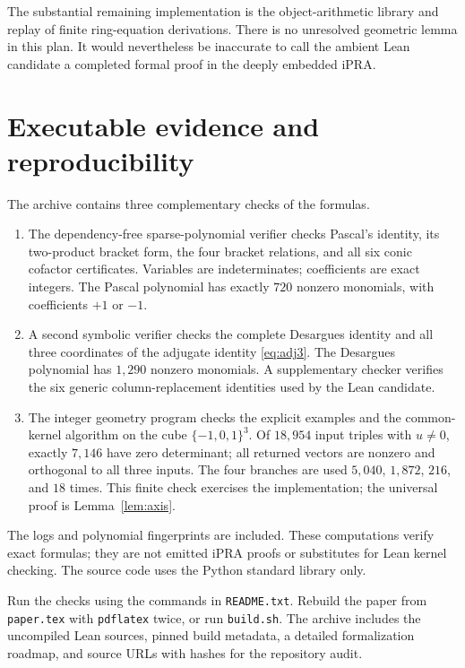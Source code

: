The substantial remaining implementation is the object-arithmetic
library and replay of finite ring-equation derivations. There is no
unresolved geometric lemma in this plan. It would nevertheless be
inaccurate to call the ambient Lean candidate a completed formal proof
in the deeply embedded iPRA.

\section{Executable evidence and reproducibility}\label{sec:evidence}

The archive contains three complementary checks of the formulas.
\begin{enumerate}
\item The dependency-free sparse-polynomial verifier checks Pascal's
identity, its two-product bracket form, the four bracket relations, and
all six conic cofactor certificates. Variables are indeterminates;
coefficients are exact integers. The Pascal polynomial has exactly
$720$ nonzero monomials, with coefficients $+1$ or $-1$.

\item A second symbolic verifier checks the complete Desargues identity
and all three coordinates of the adjugate identity
\eqref{eq:adj3}. The Desargues polynomial has $1{,}290$ nonzero monomials.
A supplementary checker verifies the six generic column-replacement
identities used by the Lean candidate.

\item The integer geometry program checks the explicit examples and
the common-kernel algorithm on the cube $\{-1,0,1\}^3$.
Of $18{,}954$ input triples with $u\ne0$, exactly $7{,}146$ have zero
determinant; all returned vectors are nonzero and orthogonal to all
three inputs. The four branches are used $5{,}040$, $1{,}872$, $216$,
and $18$ times. This finite check exercises the implementation; the
universal proof is Lemma~\ref{lem:axis}.
\end{enumerate}
The logs and polynomial fingerprints are included. These computations
verify exact formulas; they are not emitted iPRA proofs or substitutes
for Lean kernel checking. The source code uses the Python standard
library only.

Run the checks using the commands in \texttt{README.txt}. Rebuild the
paper from \texttt{paper.tex} with \texttt{pdflatex} twice, or run
\texttt{build.sh}. The archive includes the uncompiled Lean sources,
pinned build metadata, a detailed formalization roadmap, and source
URLs with hashes for the repository audit.


